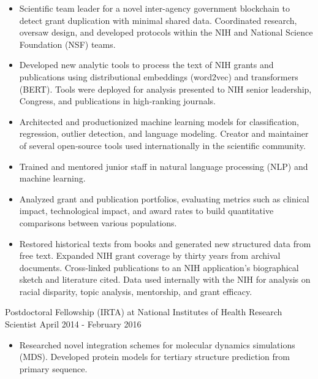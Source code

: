 \documentclass[]{scrartcl}
\begin{document}
\begin{cleanCV}
{\begin{itemize}
    \item Scientific team leader for a novel inter-agency government blockchain to detect grant duplication with minimal shared data. Coordinated research, oversaw design, and developed protocols within the NIH and National Science Foundation (NSF) teams.

    \item Developed new analytic tools to process the text of NIH grants and publications using distributional embeddings (word2vec) and transformers (BERT). Tools were deployed for analysis presented to NIH senior leadership, Congress, and publications in high-ranking journals.

    \item Architected and productionized machine learning models for classification, regression, outlier detection, and language modeling. Creator and maintainer of several open-source tools used internationally in the scientific community.

      \item Trained and mentored junior staff in natural language processing (NLP) and machine learning.
  
  \item Analyzed grant and publication portfolios, evaluating metrics such as clinical impact, technological impact, and award rates to build quantitative comparisons between various populations.
    
  \item Restored historical texts from books and generated new structured data from free text. Expanded NIH grant coverage by thirty years from archival documents. Cross-linked publications to an NIH application's biographical sketch and literature cited. Data used internally with the NIH for analysis on racial disparity, topic analysis, mentorship, and grant efficacy.    
    
  \end{itemize}
}

\vspace{0.5em}
 
\WorkExperience
{}
{Postdoctoral Fellowship (IRTA) at National Institutes of Health}
{\newline Research Scientist}
{
  \newline April 2014 - February 2016
}
{
  \begin{itemize}
  \item Researched novel integration schemes for molecular dynamics simulations (MDS). Developed protein models for tertiary structure prediction from primary sequence.


\end{itemize}}
\end{cleanCV}
\end{document}
